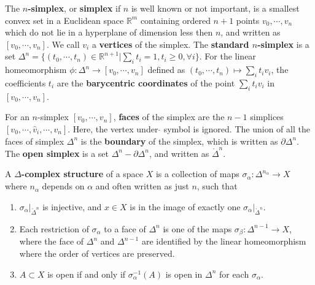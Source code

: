 \begin{defn} The \textbf{$n$-simplex}, or \textbf{simplex} if $n$ is well known or not important, is a smallest convex set in a Euclidean space $\mathbb{R}^m$ containing ordered $n+1$ points $v_0,\cdots, v_n$ which do not lie in a hyperplane of dimension less then $n$, and written as $[v_0,\cdots,v_n]$. We call $v_i$ a \textbf{vertices} of the simplex. The \textbf{standard $n$-simplex} is a set $\Delta^n =\{(t_0,\cdots,t_n)\in \mathbb{R}^{n+1}|\sum_i t_i=1, t_i\geq 0, \forall i\}$. For the linear homeomorphism $\phi:\Delta^n\rightarrow [v_0,\cdots,v_n]$ defined as $(t_0,\cdots,t_n)\mapsto \sum_i t_i v_i$, the coefficients $t_i$ are the \textbf{barycentric coordinates} of the point $\sum_i t_i v_i$ in $[v_0,\cdots,v_n]$.
\end{defn}
\begin{defn} For an $n$-simplex $[v_0,\cdots,v_n]$, \textbf{faces} of the simplex are the $n-1$ simplices $[v_0,\cdots,\hat{v}_i,\cdots,v_n]$. Here, the vertex under $\hat{}$ symbol is ignored. The union of all the faces of simplex $\Delta^n$ is the \textbf{boundary} of the simplex, which is written as $\partial\Delta^n$. The \textbf{open simplex} is a set $\Delta^n-\partial \Delta^n$, and written as $\mathring{\Delta}^n$. 
\end{defn}
\begin{defn} A \textbf{$\Delta$-complex structure} of a space $X$ is a collection of maps $\sigma_\alpha:\Delta^{n_\alpha}\rightarrow X$ where $n_\alpha$ depends on $\alpha$ and often written as just $n$, such that
\begin{enumerate}
\item $\sigma_\alpha|_{\mathring{\Delta}^n}$ is injective, and $x\in X$ is in the image of exactly one $\sigma_\alpha|_{\mathring{\Delta}^n}$.
\item Each restriction of $\sigma_\alpha$ to a face of $\Delta^n$ is one of the maps $\sigma_\beta:\Delta^{n-1}\rightarrow X$, where the face of $\Delta^n$ and $\Delta^{n-1}$ are identified by the linear homeomorphism where the order of vertices are preserved.
\item $A\subset X$ is open if and only if $\sigma_\alpha^{-1}(A)$ is open in $\Delta^n$ for each $\sigma_\alpha$.
\end{enumerate}
\end{defn}
